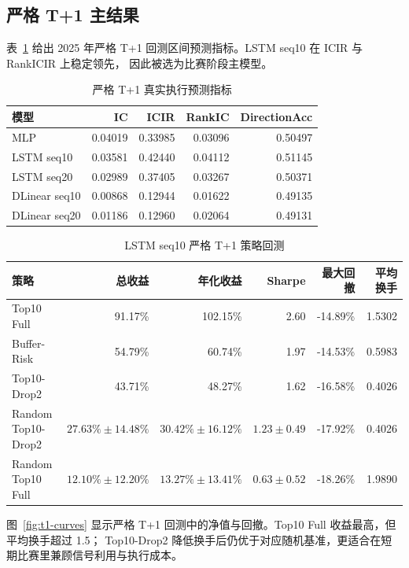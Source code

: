 \documentclass[UTF8,a4paper,11pt]{ctexart}
\begin{document}
\subsection{严格 T+1 主结果}

表~\ref{tab:oo-pred} 给出 2025 年严格 T+1 回测区间预测指标。LSTM seq10 在 ICIR 与 RankICIR 上稳定领先，
因此被选为比赛阶段主模型。

\begin{table}[H]
\centering
\caption{严格 T+1 真实执行预测指标}\label{tab:oo-pred}
\begin{tabular}{lrrrr}
\toprule
模型 & IC & ICIR & RankIC & DirectionAcc \\
\midrule
MLP & 0.04019 & 0.33985 & 0.03096 & 0.50497 \\
LSTM seq10 & 0.03581 & 0.42440 & 0.04112 & 0.51145 \\
LSTM seq20 & 0.02989 & 0.37405 & 0.03267 & 0.50371 \\
DLinear seq10 & 0.00868 & 0.12944 & 0.01622 & 0.49135 \\
DLinear seq20 & 0.01186 & 0.12960 & 0.02064 & 0.49131 \\
\bottomrule
\end{tabular}
\end{table}

\begin{table}[H]
\centering
\caption{LSTM seq10 严格 T+1 策略回测}\label{tab:lstm-oo-strategy}
\begin{tabular}{lrrrrr}
\toprule
策略 & 总收益 & 年化收益 & Sharpe & 最大回撤 & 平均换手 \\
\midrule
Top10 Full & 91.17\% & 102.15\% & 2.60 & -14.89\% & 1.5302 \\
Buffer-Risk & 54.79\% & 60.74\% & 1.97 & -14.53\% & 0.5983 \\
Top10-Drop2 & 43.71\% & 48.27\% & 1.62 & -16.58\% & 0.4026 \\
Random Top10-Drop2 & $27.63\%\pm14.48\%$ & $30.42\%\pm16.12\%$ & $1.23\pm0.49$ & -17.92\% & 0.4026 \\
Random Top10 Full & $12.10\%\pm12.20\%$ & $13.27\%\pm13.41\%$ & $0.63\pm0.52$ & -18.26\% & 1.9890 \\
\bottomrule
\end{tabular}
\end{table}

图~\ref{fig:t1-curves} 显示严格 T+1 回测中的净值与回撤。Top10 Full 收益最高，但平均换手超过 1.5；
Top10-Drop2 降低换手后仍优于对应随机基准，更适合在短期比赛里兼顾信号利用与执行成本。
\end{document}
